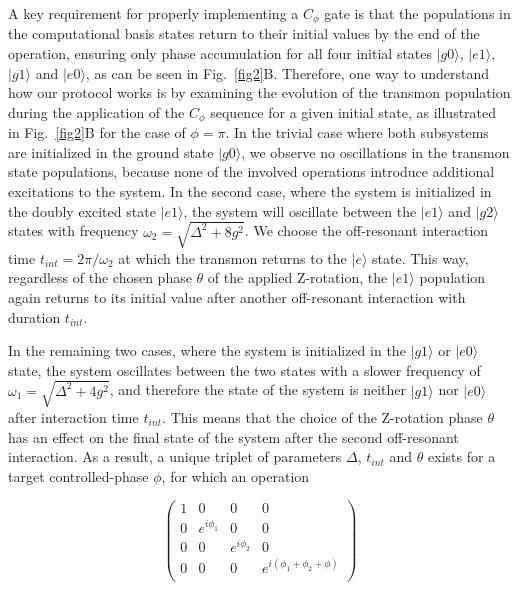 \documentclass[12pt]{article}
\newcommand{\ket}[1]{\ensuremath{|{#1}\rangle}}
\begin{document}
 A key requirement for properly implementing a $C_{\phi}$ gate is that the populations in the computational basis states return to their initial values by the end of the operation, ensuring only phase accumulation for all four initial states $\ket{g0}$, $\ket{e1}$, $\ket{g1}$ and $\ket{e0}$, as can be seen in Fig.~\ref{fig2}B. Therefore, one way to understand how our protocol works is by examining the evolution of the transmon population during the application of the $C_{\phi}$ sequence for a given initial state, as illustrated in Fig.~\ref{fig2}B for the case of $\phi = \pi$. In the trivial case where both subsystems are initialized in the ground state $\ket{g0}$, we observe no oscillations in the transmon state populations, because none of the involved operations introduce additional excitations to the system. In the second case, where the system is initialized in the doubly excited state $\ket{e1}$, the system will oscillate between the $\ket{e1}$ and $\ket{g2}$ states with frequency $\omega_2 = \sqrt{\Delta^2 + 8g^2}$. We choose the off-resonant interaction time $t_{int} = 2\pi/\omega_2$ at which the transmon returns to the $\ket{e}$ state. This way, regardless of the chosen phase $\theta$ of the applied Z-rotation, the $\ket{e1}$ population again returns to its initial value after another off-resonant interaction with duration $t_{int}$.

In the remaining two cases, where the system is initialized in the $\ket{g1}$ or $\ket{e0}$ state, the system oscillates between the two states with a slower frequency of $\omega_1 = \sqrt{\Delta^2 + 4g^2}$, and therefore the state of the system is neither $\ket{g1}$ nor $\ket{e0}$ after interaction time $t_{int}$. This means that the choice of the Z-rotation phase $\theta$ has an effect on the final state of the system after the second off-resonant interaction. As a result, a unique triplet of parameters $\Delta$, $t_{int}$ and $\theta$ exists for a target controlled-phase $\phi$, for which an operation

\begin{equation}
    \begin{pmatrix}
        1&0&0&0\\
        0&e^{i\phi_1}&0&0\\
        0&0&e^{i\phi_2}&0\\
        0&0&0&e^{i(\phi_1+\phi_2+\phi)}\\
    \end{pmatrix}
\end{equation}
\end{document}
